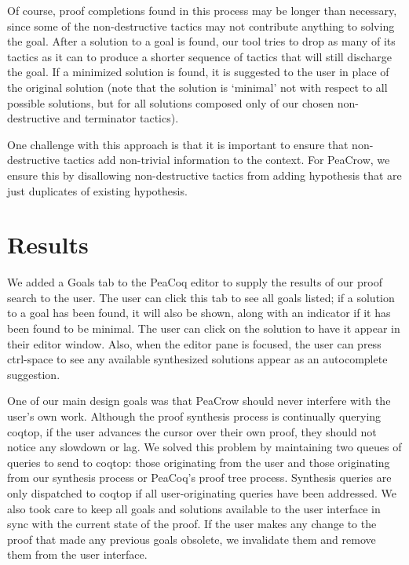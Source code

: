 \documentclass{article}
\begin{document}
Of course, proof completions found in this process may be longer than necessary, since some of the non-destructive tactics may not contribute anything to solving the goal. After a solution to a goal is found, our tool tries to drop as many of its tactics as it can to produce a shorter sequence of tactics that will still discharge the goal. If a minimized solution is found, it is suggested to the user in place of the original solution (note that the solution is ‘minimal’ not with respect to all possible solutions, but for all solutions composed only of our chosen non-destructive and terminator tactics).

One challenge with this approach is that it is important to ensure that non-destructive tactics add non-trivial information to the context. For PeaCrow, we ensure this by disallowing non-destructive tactics from adding hypothesis that are just duplicates of existing hypothesis.
\section{Results}
We added a Goals tab to the PeaCoq editor to supply the results of our proof search to the user. The user can click this tab to see all goals listed; if a solution to a goal has been found, it will also be shown, along with an indicator if it has been found to be minimal. The user can click on the solution to have it appear in their editor window. Also, when the editor pane is focused, the user can press ctrl-space to see any available synthesized solutions appear as an autocomplete suggestion.

One of our main design goals was that PeaCrow should never interfere with the user’s own work. Although the proof synthesis process is continually querying coqtop, if the user advances the cursor over their own proof, they should not notice any slowdown or lag. We solved this problem by maintaining two queues of queries to send to coqtop: those originating from the user and those originating from our synthesis process or PeaCoq’s proof tree process. Synthesis queries are only dispatched to coqtop if all user-originating queries have been addressed. We also took care to keep all goals and solutions available to the user interface in sync with the current state of the proof. If the user makes any change to the proof that made any previous goals obsolete, we invalidate them and remove them from the user interface.
\end{document}
